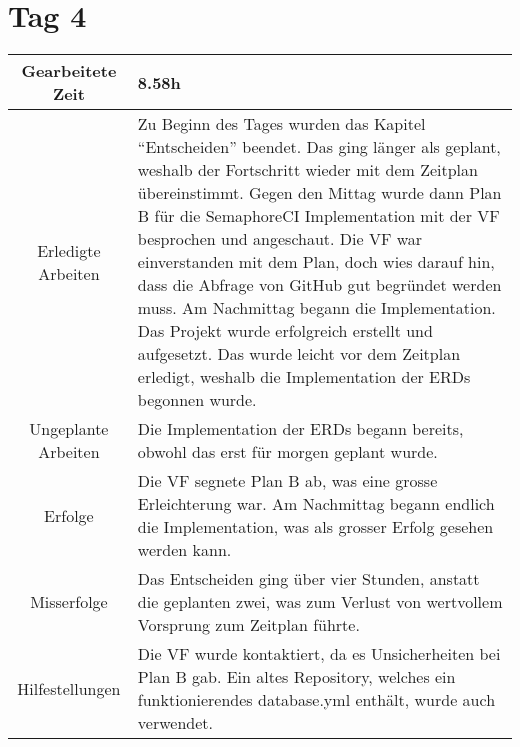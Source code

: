 \newpage

\section{Tag 4}
\begin{tabularx}{\textwidth}[H]{|c|X|}
  \hline
  Gearbeitete Zeit & 8.58h \\ \hline
  Erledigte Arbeiten & Zu Beginn des Tages wurden das Kapitel \enquote{Entscheiden} beendet. Das ging länger als geplant,
  weshalb der Fortschritt wieder mit dem Zeitplan übereinstimmt. \newline
  Gegen den Mittag wurde dann Plan B für die SemaphoreCI Implementation mit der VF besprochen und angeschaut. Die VF war einverstanden mit 
  dem Plan, doch wies darauf hin, dass die Abfrage von GitHub gut begründet werden muss. \newline
  Am Nachmittag begann die Implementation. Das Projekt wurde erfolgreich erstellt und aufgesetzt. Das wurde leicht vor dem
  Zeitplan erledigt, weshalb die Implementation der ERDs begonnen wurde. \\ \hline
  Ungeplante Arbeiten & Die Implementation der ERDs begann bereits, obwohl das erst für morgen geplant wurde. \\ \hline
  Erfolge & Die VF segnete Plan B ab, was eine grosse Erleichterung war. Am Nachmittag begann endlich die Implementation,
  was als grosser Erfolg gesehen werden kann. \\ \hline
  Misserfolge & Das Entscheiden ging über vier Stunden, anstatt die geplanten zwei, was zum Verlust von wertvollem
  Vorsprung zum Zeitplan führte. \\ \hline
  Hilfestellungen & Die VF wurde kontaktiert, da es Unsicherheiten bei Plan B gab. Ein altes Repository, welches
  ein funktionierendes database.yml enthält, wurde auch verwendet. \\ \hline
\end{tabularx}

\newpage

